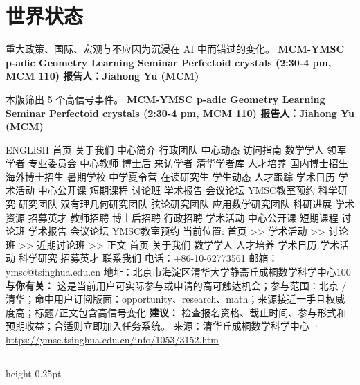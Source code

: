 \documentclass[10.5pt]{ctexart}
\begin{document}
\section*{世界状态}
{\color{ormuted} 重大政策、国际、宏观与不应因为沉浸在 AI 中而错过的变化。}
\vspace{2mm}
{\LARGE\bfseries MCM-YMSC p-adic Geometry Learning Seminar Perfectoid crystals (2:30-4 pm, MCM 110) 报告人：Jiahong Yu (MCM)}\par
\vspace{1mm}
{\color{ormuted} 本版筛出 5 个高信号事件。}
\vspace{3mm}
{\Large\bfseries MCM-YMSC p-adic Geometry Learning Seminar Perfectoid crystals (2:30-4 pm, MCM 110) 报告人：Jiahong Yu (MCM)}\par
ENGLISH 首页 关于我们 中心简介 行政团队 中心动态 访问指南 数学学人 领军学者 专业委员会 中心教师 博士后 来访学者 清华学者库 人才培养 国内博士招生 海外博士招生 暑期学校 中学夏令营 在读研究生 学生动态 人才跟踪 学术日历 学术活动 中心公开课 短期课程 讨论班 学术报告 会议论坛 YMSC教室预约 科学研究 研究团队 双有理几何研究团队 弦论研究团队 应用数学研究团队 科研进展 学术资源 招募英才 教师招聘 博士后招聘 行政招聘 学术活动 中心公开课 短期课程 讨论班 学术报告 会议论坛 YMSC教室预约 当前位置: 首页 >> 学术活动 >> 讨论班 >> 近期讨论班 >> 正文 首页 关于我们 数学学人 人才培养 学术日历 学术活动 科学研究 招募英才 联系我们 电话：+86-10-62773561 邮箱：ymsc@tsinghua.edu.cn 地址：北京市海淀区清华大学静斋丘成桐数学科学中心100
\textbf{与你有关：} 这是当前用户可实际参与或申请的高可触达机会；参与范围：北京 / 清华；命中用户订阅版面：opportunity、research、math；来源接近一手且权威度高；标题/正文包含高信号变化
\textbf{建议：} 检查报名资格、截止时间、参与形式和预期收益；合适则立即加入任务系统。
{\footnotesize\color{ormuted} 来源：清华丘成桐数学科学中心 · \url{https://ymsc.tsinghua.edu.cn/info/1053/3152.htm}}
\vspace{4mm}
\hrule height 0.25pt
\vspace{3mm}
\end{document}
